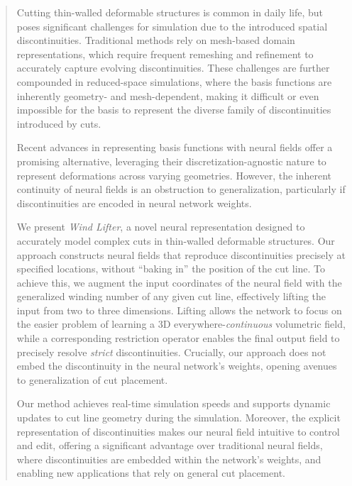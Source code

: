 \begin{abstract}
Cutting  thin-walled deformable structures is common in daily life, but poses significant challenges for simulation due to the introduced spatial discontinuities. Traditional methods rely on mesh-based domain representations, which require frequent remeshing and refinement to accurately capture evolving discontinuities. These challenges are further compounded in reduced-space simulations, where the basis functions are inherently geometry- and mesh-dependent, making it difficult or even impossible for the basis to represent the diverse family of discontinuities introduced by cuts.

Recent advances in representing basis functions with neural fields offer a promising alternative, leveraging their discretization-agnostic nature to represent deformations across varying geometries. However, the inherent continuity of neural fields is an obstruction to generalization, particularly if discontinuities are encoded in neural network weights.

We present \emph{Wind Lifter}, a novel neural representation designed to accurately model complex cuts in thin-walled deformable structures. Our approach constructs neural fields that reproduce discontinuities precisely at specified locations, without ``baking in'' the position of the cut line. To achieve this, we augment the input coordinates of the neural field with the generalized winding number of any given cut line, effectively lifting the input from two to three dimensions. Lifting allows the network to focus on the easier problem of learning a 3D everywhere-\emph{continuous} volumetric field, while a corresponding restriction operator enables the final output field to precisely resolve \emph{strict} discontinuities. Crucially, our approach does not embed the discontinuity in the neural network's weights, opening avenues to generalization of cut placement.

Our method achieves real-time simulation speeds and supports dynamic updates to cut line geometry during the simulation. Moreover, the explicit representation of discontinuities makes our neural field intuitive to control and edit, offering a significant advantage over traditional neural fields, where discontinuities are embedded within the network’s weights, and enabling new applications that rely on general cut placement.
    
\end{abstract}